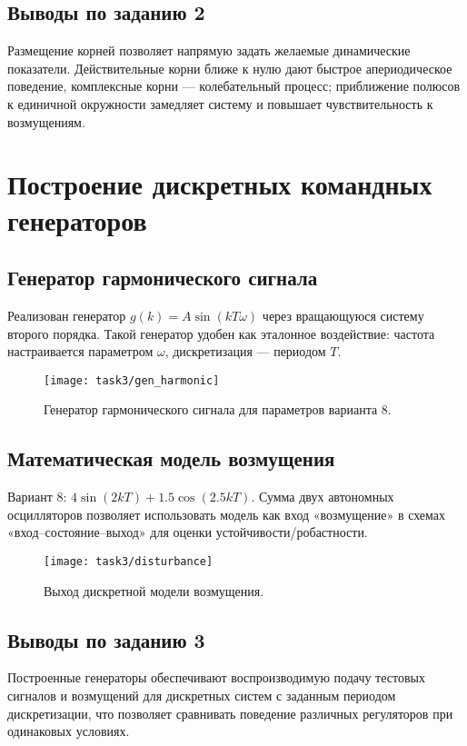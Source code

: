 \section*{Выводы по заданию 2}
Размещение корней позволяет напрямую задать желаемые динамические показатели. Действительные корни ближе к нулю дают быстрое апериодическое поведение, комплексные корни — колебательный процесс; приближение полюсов к единичной окружности замедляет систему и повышает чувствительность к возмущениям.

\chapter{Построение дискретных командных генераторов}
\section{Генератор гармонического сигнала}
Реализован генератор \(g(k) = A\sin(kT\omega)\) через вращающуюся систему второго порядка. Такой генератор удобен как эталонное воздействие: частота настраивается параметром \(\omega\), дискретизация — периодом \(T\).
\begin{figure}[H]
  \centering
  \texttt{[image: task3/gen\_harmonic]}
  \caption{Генератор гармонического сигнала для параметров варианта 8.}
\end{figure}

\section{Математическая модель возмущения}
Вариант 8: \(4\sin(2kT) + 1.5\cos(2.5kT)\). Сумма двух автономных осцилляторов позволяет использовать модель как вход «возмущение» в схемах «вход–состояние–выход» для оценки устойчивости/робастности.
\begin{figure}[H]
  \centering
  \texttt{[image: task3/disturbance]}
  \caption{Выход дискретной модели возмущения.}
\end{figure}

\section*{Выводы по заданию 3}
Построенные генераторы обеспечивают воспроизводимую подачу тестовых сигналов и возмущений для дискретных систем с заданным периодом дискретизации, что позволяет сравнивать поведение различных регуляторов при одинаковых условиях.
